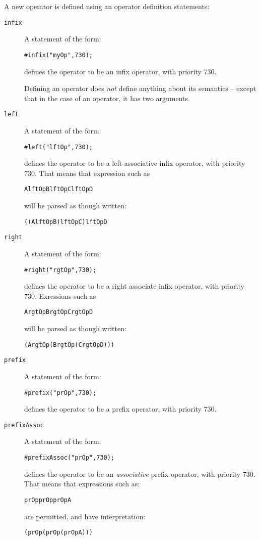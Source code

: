 A new operator is defined using an operator definition statements:
\begin{description}
\item[\tt infix]
A statement of the form:
\begin{alltt}
#infix("myOp",730);
\end{alltt}
defines the operator  to be an infix operator, with priority 730. 
\begin{aside}
Defining an operator does \emph{not} define anything about its semantics -- except that in the case of an  operator, it has two arguments.
\end{aside}
\item[\tt left]
A statement of the form:
\begin{alltt}
#left("lftOp",730);
\end{alltt}
defines the operator  to be a left-associative infix operator, with priority 730. That means that expression such as
\begin{alltt}
A lftOp B lftOp C lftOp D
\end{alltt}
will be parsed as though written:
\begin{alltt}
((A lftOp B) lftOp C) lftOp D
\end{alltt}

\item[\tt right]
A statement of the form:
\begin{alltt}
#right("rgtOp",730);
\end{alltt}
defines the operator  to be a right associate infix operator, with priority 730. Exressions such as
\begin{alltt}
A rgtOp B rgtOp C rgtOp D
\end{alltt}
will be parsed as though written:
\begin{alltt}
(A rgtOp (B rgtOp (C rgtOp D)))
\end{alltt}

\item[\tt prefix]
A statement of the form:
\begin{alltt}
#prefix("prOp",730);
\end{alltt}
defines the operator  to be a prefix operator, with priority 730. 

\item[\tt prefixAssoc]
A statement of the form:
\begin{alltt}
#prefixAssoc("prOp",730);
\end{alltt}
defines the operator  to be an \emph{associative} prefix operator, with priority 730. That means that expressions such as:
\begin{alltt}
prOp prOp prOp A
\end{alltt}
are permitted, and have interpretation:
\begin{alltt}
(prOp (prOp (prOp A)))
\end{alltt}


\end{description}
